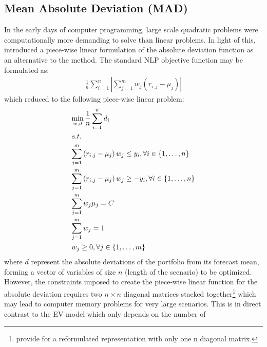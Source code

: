 \subsection{Mean Absolute Deviation (MAD)}
In the early days of computer programming, large scale quadratic problems
were computationally more demanding to solve than linear problems. In light
of this,  introduced a piece-wise linear formulation of
the absolute deviation function as an alternative to the
 method. The standard NLP objective function may be
formulated as:
\begin{equation}\label{madnlp}
\begin{gathered}
\frac{1}{n}\sum\limits_{i=1}^n {\left| {\sum\limits_{j=1}^m {{w_j}\left( {{r_{i,j}} - {\mu _j}} \right)} } \right|}
\end{gathered}
\end{equation}
which  reduced to the following piece-wise linear problem:
\begin{equation}\label{madlp}
\begin{gathered}
  \mathop {\min }\limits_{w,d} \frac{1}{n}\sum\limits_{i=1}^n {{d_i}}  \hfill \\
  s.t. \hfill \\
  \sum\limits_{j=1}^m {\left( {{r_{i,j}} - {\mu _j}} \right){w_j} \leq {y_i},\forall i \in \left\{ {1,\dots,n} \right\}}  \hfill \\
  \sum\limits_{j=1}^m {\left( {{r_{i,j}} - {\mu _j}} \right){w_j} \geq  - {y_i},\forall i \in \left\{ {1,\dots,n} \right\}}  \hfill \\
  \sum\limits_{j=1}^m {{w_j}{\mu _j}=C}  \hfill \\
  \sum\limits_{j=1}^m {{w_j}=1}  \hfill \\
  {w_j} \geq 0,\forall j \in \left\{ {1,\dots,m} \right\} \hfill \\
\end{gathered}
\end{equation}
where $d$ represent the absolute deviations of the portfolio from its
forecast mean, forming a vector of variables of size $n$ (length of the
scenario) to be optimized. However, the constraints imposed to create the
piece-wise linear function for the absolute deviation requires two $n\times
n$ diagonal matrices stacked together\footnote{
provide for a reformulated representation with only one n diagonal matrix.}
which may lead to computer memory problems for very large scenarios. This is
in direct contrast to the EV model which only depends on the number of
